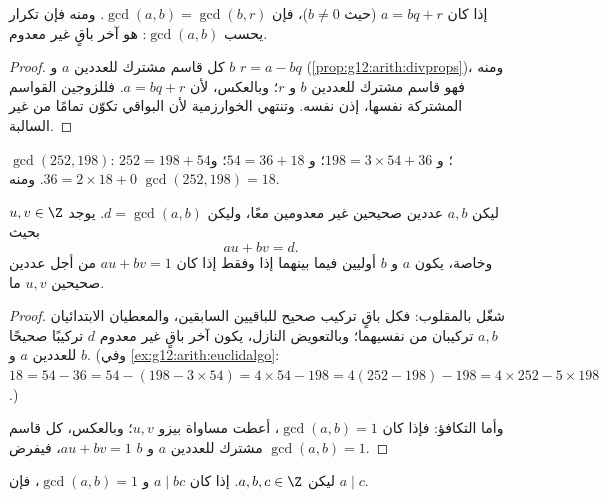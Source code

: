 \begin{proposition}\label{prop:g12:arith:euclidalgo}
إذا كان $a = bq + r$ (حيث $b \neq 0$)، فإن $\gcd(a, b) = \gcd(b, r)$. ومنه فإن تكرار
 يحسب $\gcd(a,b)$:  هو آخر باقٍ
غير معدوم.
\end{proposition}

\begin{proof}
كل قاسم مشترك للعددين $a$ و $b$  $r = a - bq$
(\cref{prop:g12:arith:divprops})، ومنه فهو قاسم مشترك للعددين $b$ و $r$؛
وبالعكس، لأن $a = bq + r$. فللزوجين القواسم المشتركة نفسها،
إذن  نفسه. وتنتهي الخوارزمية لأن البواقي
تكوّن   تمامًا من  غير السالبة.
\end{proof}

\begin{example}\label{ex:g12:arith:euclidalgo}
$\gcd(252, 198)$: $252 = 198 + 54$؛ و $198 = 3\times54 + 36$؛
و $54 = 36 + 18$؛ و $36 = 2 \times 18 + 0$. ومنه $\gcd(252,198) = 18$.
\end{example}

\begin{theorem}\label{thm:g12:arith:bezout}
ليكن $a, b$ عددين صحيحين غير معدومين معًا، وليكن $d = \gcd(a,b)$. يوجد
$u, v \in \Z$ بحيث
\[
au + bv = d .
\]
وخاصة، يكون $a$ و $b$ أوليين فيما بينهما إذا وفقط إذا كان $au + bv = 1$ من أجل
عددين صحيحين $u, v$ ما.
\end{theorem}

\begin{proof}
شغّل  بالمقلوب: فكل باقٍ تركيب صحيح
للباقيين السابقين، والمعطيان الابتدائيان $a, b$ تركيبان من
نفسيهما؛ وبالتعويض النازل، يكون آخر باقٍ غير معدوم $d$
تركيبًا صحيحًا للعددين $a$ و $b$. (وفي \cref{ex:g12:arith:euclidalgo}:
$18 = 54 - 36 = 54 - (198 - 3\times54) = 4\times54 - 198 =
4(252 - 198) - 198 = 4\times252 - 5\times198$.)

وأما التكافؤ: فإذا كان $\gcd(a,b) = 1$، أعطت مساواة بيزو $u, v$؛ وبالعكس،
كل قاسم مشترك للعددين $a$ و $b$  $au + bv = 1$، فيفرض
$\gcd(a,b) = 1$.
\end{proof}

\begin{theorem}\label{thm:g12:arith:gauss}
ليكن $a, b, c \in \Z$. إذا كان $a \mid bc$ و $\gcd(a, b) = 1$، فإن $a \mid c$.
\end{theorem}

